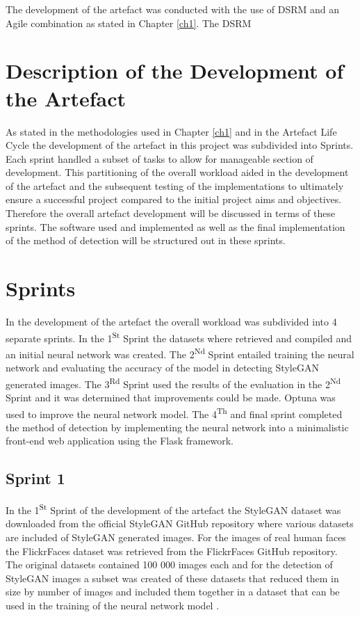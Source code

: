 The development of the artefact was conducted with the use of DSRM and an Agile combination as stated in  Chapter \ref{ch1}. The DSRM  

\section{Description of the Development of the Artefact}

As stated in the methodologies used in Chapter \ref{ch1} and in the Artefact Life Cycle the development of the artefact in this project was subdivided into Sprints. Each sprint handled a subset of tasks to allow for manageable section of development. This partitioning of the overall workload aided in the development of the artefact and the subsequent testing of the implementations to ultimately ensure a successful project compared to the initial project aims and objectives. Therefore the overall artefact development will be discussed in terms of these sprints. The software used and implemented as well as the final implementation of the method of detection will be structured out in these sprints. 

\section{Sprints}

In the development of the artefact the overall workload was subdivided into 4 separate sprints. In the 1\textsuperscript{St} Sprint the datasets where retrieved and compiled and an initial neural network was created. The 2\textsuperscript{Nd} Sprint entailed training the neural network and evaluating the accuracy of the model in detecting StyleGAN generated images. The 3\textsuperscript{Rd} Sprint used the results of the evaluation in the 2\textsuperscript{Nd} Sprint and it was determined that improvements could be made. Optuna was used to improve the neural network model. The 4\textsuperscript{Th} and final sprint completed the method of detection by implementing the neural network into a minimalistic front-end web application using the Flask framework.

\subsection{Sprint 1}

In the 1\textsuperscript{St} Sprint of the development of the artefact the StyleGAN dataset was downloaded from the official StyleGAN GitHub repository where various datasets are included of StyleGAN generated images. For the images of real human faces the FlickrFaces dataset was retrieved from the FlickrFaces GitHub repository. The original datasets contained 100 000 images each and for the detection of StyleGAN images a subset was created of these datasets that reduced them in size by number of images and included them together in a dataset that can be used in the training of the neural network model \citep{Karras2019}.

